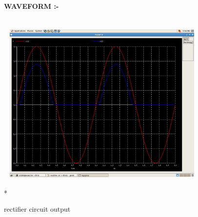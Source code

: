 \documentclass{article}
\begin{document}
\begin{flushleft}
\begin{figure}[ht] 
\large{{\bf\textcolor{rosewood}{ WAVEFORM} :-}}\vspace{5mm} \\*
\includegraphics[width=10cm, height=10cm]{rectifier.png} 
\caption{rectifier circuit output} 
\label{fig:circuit2} 
\end{figure} 
\end{flushleft}
\newpage 
\end{document}
